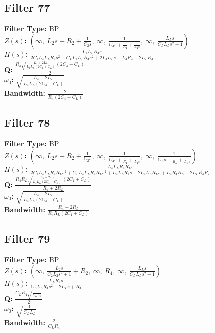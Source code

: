 \documentclass{article}
\begin{document}
\subsection*{Filter 77}
\textbf{Filter Type:} BP \\ 
\textbf{$Z(s)$:} $\left( \infty, \  L_{2} s + R_{2} + \frac{1}{C_{2} s}, \  \infty, \  \frac{1}{C_{4} s + \frac{1}{R_{4}} + \frac{1}{L_{4} s}}, \  \infty, \  \frac{L_{L} s}{C_{L} L_{L} s^{2} + 1}\right)$ \\ 
\textbf{$H(s)$:} $\frac{L_{4} L_{L} R_{4} s}{2 C_{4} L_{4} L_{L} R_{4} s^{2} + C_{L} L_{4} L_{L} R_{4} s^{2} + 2 L_{4} L_{L} s + L_{4} R_{4} + 2 L_{L} R_{4}}$ \\ 
\textbf{Q:} $\frac{R_{4} \sqrt{\frac{L_{4} + 2 L_{L}}{L_{4} L_{L} \left(2 C_{4} + C_{L}\right)}} \left(2 C_{4} + C_{L}\right)}{2}$ \\ 
\textbf{$\omega_0$:} $\sqrt{\frac{L_{4} + 2 L_{L}}{L_{4} L_{L} \left(2 C_{4} + C_{L}\right)}}$ \\ 
\textbf{Bandwidth:} $\frac{2}{R_{4} \left(2 C_{4} + C_{L}\right)}$ \\ 
\subsection*{Filter 78}
\textbf{Filter Type:} BP \\ 
\textbf{$Z(s)$:} $\left( \infty, \  L_{2} s + R_{2} + \frac{1}{C_{2} s}, \  \infty, \  \frac{1}{C_{4} s + \frac{1}{R_{4}} + \frac{1}{L_{4} s}}, \  \infty, \  \frac{1}{C_{L} s + \frac{1}{R_{L}} + \frac{1}{L_{L} s}}\right)$ \\ 
\textbf{$H(s)$:} $\frac{L_{4} L_{L} R_{4} R_{L} s}{2 C_{4} L_{4} L_{L} R_{4} R_{L} s^{2} + C_{L} L_{4} L_{L} R_{4} R_{L} s^{2} + L_{4} L_{L} R_{4} s + 2 L_{4} L_{L} R_{L} s + L_{4} R_{4} R_{L} + 2 L_{L} R_{4} R_{L}}$ \\ 
\textbf{Q:} $\frac{R_{4} R_{L} \sqrt{\frac{L_{4} + 2 L_{L}}{L_{4} L_{L} \left(2 C_{4} + C_{L}\right)}} \left(2 C_{4} + C_{L}\right)}{R_{4} + 2 R_{L}}$ \\ 
\textbf{$\omega_0$:} $\sqrt{\frac{L_{4} + 2 L_{L}}{L_{4} L_{L} \left(2 C_{4} + C_{L}\right)}}$ \\ 
\textbf{Bandwidth:} $\frac{R_{4} + 2 R_{L}}{R_{4} R_{L} \left(2 C_{4} + C_{L}\right)}$ \\ 
\subsection*{Filter 79}
\textbf{Filter Type:} BP \\ 
\textbf{$Z(s)$:} $\left( \infty, \  \frac{L_{2} s}{C_{2} L_{2} s^{2} + 1} + R_{2}, \  \infty, \  R_{4}, \  \infty, \  \frac{L_{L} s}{C_{L} L_{L} s^{2} + 1}\right)$ \\ 
\textbf{$H(s)$:} $\frac{L_{L} R_{4} s}{C_{L} L_{L} R_{4} s^{2} + 2 L_{L} s + R_{4}}$ \\ 
\textbf{Q:} $\frac{C_{L} R_{4} \sqrt{\frac{1}{C_{L} L_{L}}}}{2}$ \\ 
\textbf{$\omega_0$:} $\sqrt{\frac{1}{C_{L} L_{L}}}$ \\ 
\textbf{Bandwidth:} $\frac{2}{C_{L} R_{4}}$ \\ 
\end{document}
